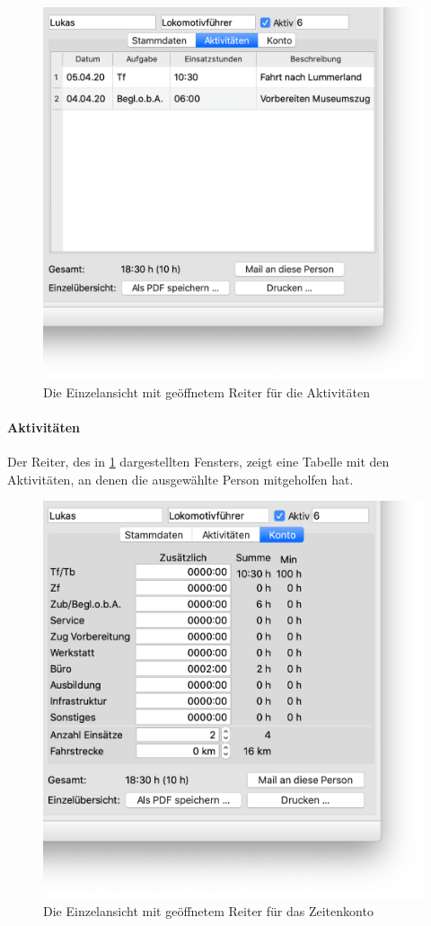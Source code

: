 

\begin{figure}[!h]
	\centering
	\includegraphics[width=.75\textwidth]{img/einzelansicht_aktivitaeten}
	\caption{Die Einzelansicht mit geöffnetem Reiter für die Aktivitäten}
	\label{fig:einsatz:personal:einzel:aktivitaeten}
\end{figure}
\paragraph{Aktivitäten}
Der Reiter,
des in \cref{fig:einsatz:personal:einzel:aktivitaeten} dargestellten Fensters,
zeigt eine Tabelle mit den Aktivitäten,
an denen die ausgewählte Person mitgeholfen hat.


\begin{figure}[!h]
	\centering
	\includegraphics[width=.75\textwidth]{img/einzelansicht_konto}
	\caption{Die Einzelansicht mit geöffnetem Reiter für das Zeitenkonto}
	\label{fig:einsatz:personal:einzel:konto}
\end{figure}
